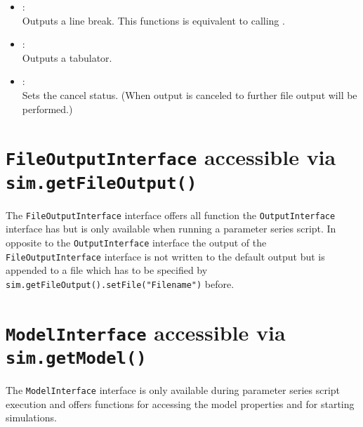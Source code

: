 \begin{itemize}
\item
{}:\\
Outputs a line break. This functions is equivalent to calling
.

\item
{}:\\
Outputs a tabulator.

\item
{}:\\
Sets the cancel status. (When output is canceled to further file output will be performed.)

\end{itemize}



\chapter{\texttt{FileOutputInterface} accessible via \texttt{sim.getFileOutput()}}

The \texttt{FileOutputInterface} interface offers all function the \texttt{OutputInterface} interface has
but is only available when running a parameter series script. In opposite
to the \texttt{OutputInterface} interface the output of the \texttt{FileOutputInterface} interface
is not written to the default output but is appended to a file which has
to be specified by \texttt{sim.getFileOutput().setFile("{}Filename")} before.



\chapter{\texttt{ModelInterface} accessible via \texttt{sim.getModel()}}

The \texttt{ModelInterface} interface is only available during parameter series
script execution and offers functions for accessing the model
properties and for starting simulations.

